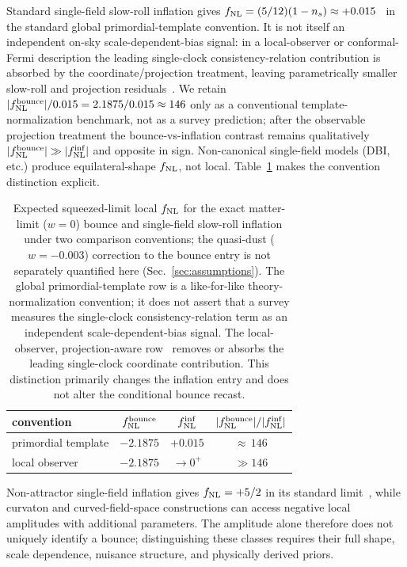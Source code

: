 \documentclass[aps,prd,twocolumn,superscriptaddress,showpacs,preprintnumbers,nofootinbib,longbibliography,floatfix]{revtex4-2}
\newcommand{\fnl}{f_{\rm NL}}
\begin{document}
Standard single-field slow-roll inflation gives $\fnl = (5/12)(1-n_s) \approx +0.015$~\cite{Maldacena:2002vr} in the standard global primordial-template convention. It is not itself an independent on-sky scale-dependent-bias signal: in a local-observer or conformal-Fermi description the leading single-clock consistency-relation contribution is absorbed by the coordinate/projection treatment, leaving parametrically smaller slow-roll and projection residuals~\cite{Pajer:2013,TanakaUrakawa:2011}. We retain $|\fnl^{\rm bounce}|/0.015 = 2.1875/0.015 \approx 146$ only as a conventional template-normalization benchmark, not as a survey prediction; after the observable projection treatment the bounce-vs-inflation contrast remains qualitatively $|\fnl^{\rm bounce}| \gg |\fnl^{\rm inf}|$ and opposite in sign. Non-canonical single-field models (DBI, etc.) produce equilateral-shape $\fnl$, not local. Table~\ref{tab:frames} makes the convention distinction explicit.
\begin{table}[h]
\centering
\caption{\label{tab:frames}Expected squeezed-limit local $\fnl$ for the exact matter-limit ($w=0$) bounce and single-field slow-roll inflation under two comparison conventions; the quasi-dust ($w=-0.003$) correction to the bounce entry is not separately quantified here (Sec.~\ref{sec:assumptions}). The global primordial-template row is a like-for-like theory-normalization convention; it does not assert that a survey measures the single-clock consistency-relation term as an independent scale-dependent-bias signal. The local-observer, projection-aware row~\cite{Pajer:2013,TanakaUrakawa:2011} removes or absorbs the leading single-clock coordinate contribution. This distinction primarily changes the inflation entry and does not alter the conditional bounce recast.}
\begin{ruledtabular}
\begin{tabular}{lccc}
convention & $\fnl^{\rm bounce}$ & $\fnl^{\rm inf}$ & $|\fnl^{\rm bounce}|/|\fnl^{\rm inf}|$ \\ \hline
primordial template & $-2.1875$ & $+0.015$ & ${\approx}\,146$ \\
local observer & $-2.1875$ & $\to 0^{+}$ & $\gg 146$ \\
\end{tabular}
\end{ruledtabular}
\end{table}

Non-attractor single-field inflation gives $\fnl=+5/2$ in its standard limit~\cite{Cai:2018non}, while curvaton and curved-field-space constructions can access negative local amplitudes with additional parameters. The amplitude alone therefore does not uniquely identify a bounce; distinguishing these classes requires their full shape, scale dependence, nuisance structure, and physically derived priors.
\end{document}
